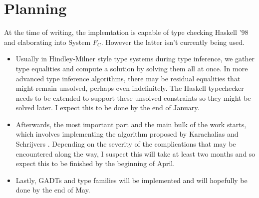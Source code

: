 \section{Planning}
At the time of writing, the implemtation is capable of type checking Haskell '98
and elaborating into System $F_C$. However the latter isn't currently being
used.

\begin{itemize}
    \item Usually in Hindley-Milner style type systems during type inference, we
        gather type equalities and compute a solution by solving them all at
        once. In more advanced type inference algorithms, there may be
        residual equalities that might remain unsolved, perhaps even
        indefinitely. The Haskell typechecker needs to be extended to support
        these unsolved constraints so they might be solved later. I expect this
        to be done by the end of January.
    \item Afterwards, the most important part and the main bulk of the work
        starts, which involves implementing the algorithm proposed by
        Karachalias and Schrijvers \cite{Karachalias:2017:EFD:3156695.3122966}.
        Depending on the severity of the complications that may be encountered
        along the way, I suspect this will take at least two months and so
        expect this to be finished by the beginning of April.
    \item Lastly, GADTs and type families will be implemented and will hopefully
        be done by the end of May.
\end{itemize}
